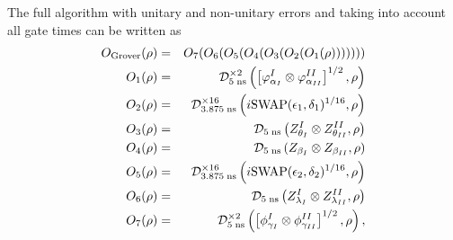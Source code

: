 The full algorithm with unitary and non-unitary errors and taking into account all gate times can be written as
%
\begin{eqnarray}
O_\mathrm{Grover}(\rho) & = & O_7(O_6(O_5(O_4(O_3(O_2(O_1(\rho))))))) \label{eq:grover_error_model} \\
O_1(\rho) & = & \De^{\times 2}_{5\;\mathrm{ns}}\left(\left[\varphi_{\alpha_I}^I\otimes \varphi_{\alpha_{II}}^{II}\right]^{1/2},\rho\right) \notag \\
O_2(\rho) & = & \De^{\times 16}_{3.875\;\mathrm{ns}}\left(i\mathrm{SWAP}(\epsilon_1,\delta_1)^{1/16},\rho\right) \notag \\
O_3(\rho) & = & \De_{5\;\mathrm{ns}}\left(Z_{\theta_I}^I\otimes Z_{\theta_{II}}^{II},\rho\right) \notag \\
O_4(\rho) & = & \De_{5\;\mathrm{ns}}\left(Z_{\beta_I}\otimes Z_{\beta_{II}},\rho\right) \notag \\ 
O_5(\rho) & = & \De^{\times 16}_{3.875\;\mathrm{ns}}\left(i\mathrm{SWAP}(\epsilon_2,\delta_2)^{1/16},\rho\right) \notag \\ 
O_6(\rho) & = & \De_{5\;\mathrm{ns}}\left(Z_{\lambda_I}^I\otimes Z_{\lambda_{II}}^{II},\rho\right) \notag \\
O_7(\rho) & = & \De^{\times 2}_{5\;\mathrm{ns}}\left(\left[\phi_{\gamma_I}^I\otimes \phi_{\gamma_{II}}^{II}\right]^{1/2},\rho\right), \notag
\end{eqnarray}
%
